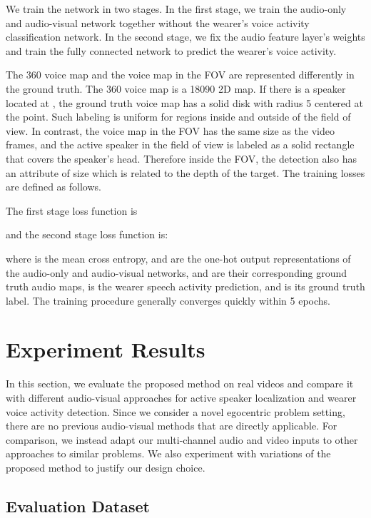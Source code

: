 \documentclass[10pt,twocolumn,letterpaper]{article}
\begin{document}
We train the network in two stages. 
In the first stage, we train the audio-only and audio-visual network together without the wearer's voice activity classification network. 
In the second stage, we fix the audio feature layer's weights and train  
the fully connected network to predict the wearer's voice activity. 

The 360 voice map and the voice map in the FOV are represented
differently in the ground truth. The 360  voice map is a 18090 2D map. If there is a speaker located at ,
the ground truth voice map has a solid disk with radius 5 centered at the point. Such labeling is uniform for regions 
inside and outside of the field of view. In contrast, the voice map in the FOV has the same size as the video frames, and 
the active speaker in the field of view is labeled as a solid rectangle that covers the speaker's
head. Therefore inside the FOV, the detection also has an attribute of size which is related to the depth of the target. The
training losses are defined as follows.

The first stage loss function is

and the second stage loss function is:
	
where  is the mean cross entropy, 
 and  are the one-hot output representations of the audio-only and audio-visual networks, 
 and  are their corresponding ground truth audio maps, 
 is the wearer speech activity prediction, and  is its ground truth label.
The training procedure generally converges quickly within 5 epochs.  



\section{Experiment Results}
\vspace{-5pt}

In this section, we evaluate the proposed method on real videos and compare it with different audio-visual approaches
for active speaker localization and wearer voice activity detection.
Since we consider a novel egocentric problem setting, 
there are no previous audio-visual methods that are directly applicable.
For comparison, we instead adapt our multi-channel audio and video inputs to other
approaches to similar problems.
We also experiment with variations of the proposed method to justify our design choice.

\subsection{Evaluation Dataset}
\vspace{-5pt}
\end{document}
